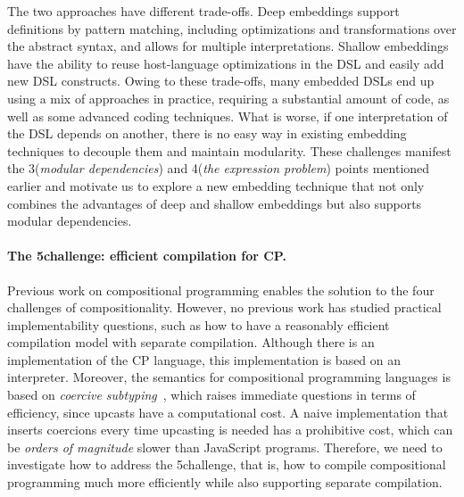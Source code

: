 The two approaches have different trade-offs. Deep embeddings support
definitions by pattern matching, including optimizations and transformations
over the abstract syntax, and allows for multiple interpretations. Shallow
embeddings have the ability to reuse host-language optimizations in the DSL and
easily add new DSL constructs. Owing to these trade-offs, many embedded DSLs end
up using a mix of approaches in practice, requiring a substantial amount of
code, as well as some advanced coding techniques. What is worse, if one
interpretation of the DSL depends on another, there is no easy way in existing
embedding techniques to decouple them and maintain modularity. These challenges
manifest the 3\rd (\emph{modular dependencies}) and 4\th (\emph{the expression
problem}) points mentioned earlier and motivate us to explore a new embedding
technique that not only combines the advantages of deep and shallow embeddings
but also supports modular dependencies.

\paragraph{The 5\th challenge: efficient compilation for CP.}
Previous work on compositional programming enables the solution to the four
challenges of compositionality.
However, no previous work has studied practical implementability
questions, such as how to have a reasonably efficient compilation model with
separate compilation. Although there is an implementation of the CP language,
this implementation is based on an interpreter. Moreover, the semantics for
compositional programming languages is based on \emph{coercive
subtyping}~\citep{luo2013coercive}, which raises immediate questions in terms of
efficiency, since upcasts have a computational cost. A naive implementation that
inserts coercions every time upcasting is needed has a prohibitive cost, which
can be \emph{orders of magnitude} slower than JavaScript programs.
Therefore, we need to investigate how to address the 5\th challenge, that is,
how to compile compositional programming much more efficiently while also supporting
separate compilation.


